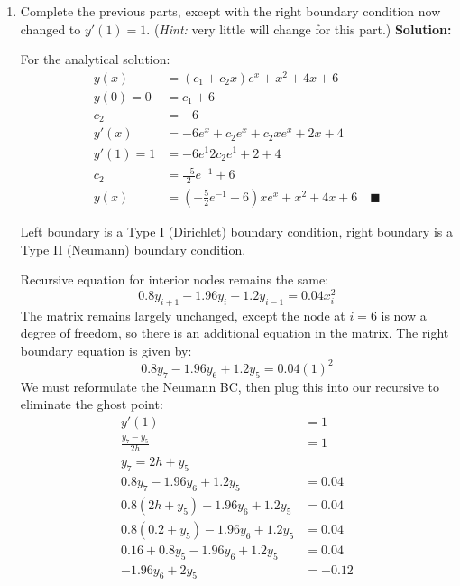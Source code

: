 \documentclass[letterpaper, fontsize=11pt]{scrartcl} %
\numberwithin{equation}{section} %
\numberwithin{figure}{section} %
\numberwithin{table}{section} %
\begin{document}
\begin{enumerate}
\begin{enumerate}
\begin{align*}
\begin{array}{cccc}
 1.2 &-1.96 &0.8 &0 \\
 0&1.2 &-1.96 &0.8 \\
0 &0 &1.2 &-1.96 \\ 
\end{array}
\right] 
\left[ \begin{array}{c}
y_2 \\ y_3 \\ y_4 \\ y_5 \end{array} \right]
&= \left[\begin{array}{c} 0.0016 \\ 0.0064 \\ 0.0144 \\ 0.7744 \end{array} \right]
\end{align*}
\item Complete the previous parts, except with the right boundary condition now changed to $y'(1) = 1$. (\textit{Hint:} very little will change for this part.) \newline
\textbf{Solution:}
\par For the analytical solution:
\begin{align*}
y(x) &= (c_1 + c_2x)e^x + x^2 + 4x + 6\\
y(0) = 0 &= c_1+6\\
c_2 &= -6\\
y'(x) &= -6e^x + c_2e^x + c_2xe^x + 2x + 4\\
y'(1) = 1 &= -6e^1 2c_2 e^1 + 2 + 4\\
c_2&= \frac{-5}{2}e^{-1} + 6\\
y(x) &=\left (-\frac{5}{2}e^{-1} + 6\right)xe^{x} +x^2 + 4x + 6\quad \blacksquare
\end{align*}

\par Left boundary is a Type I (Dirichlet) boundary condition, right boundary is a Type II (Neumann) boundary condition. 
\par Recursive equation for interior nodes remains the same: 
$$0.8y_{i+1} -1.96y_i+ 1.2y_{i-1} = 0.04x_i^2$$
The matrix remains largely unchanged, except the node at $i=6$ is now a degree of freedom, so there is an additional equation in the matrix. The right boundary equation is given by:
$$0.8y_{7} -1.96y_6+ 1.2y_{5} = 0.04(1)^2$$
We must reformulate the Neumann BC, then plug this into our recursive to eliminate the ghost point:
\begin{align*}
y'(1) &= 1 \\
\frac{y_7 - y_5}{2h} &= 1 \\
y_7 = 2h + y_5 \\
0.8y_{7} -1.96y_6+ 1.2y_{5} &= 0.04\\
0.8(2h + y_5) -1.96y_6+ 1.2y_{5} &= 0.04\\
0.8(0.2 + y_5) -1.96y_6+ 1.2y_{5} &= 0.04\\
0.16 + 0.8y_5 -1.96y_6+ 1.2y_{5} &= 0.04\\
-1.96y_6 + 2 y_5 &= -0.12
\end{align*}


\end{enumerate}
\end{enumerate}
\end{document}
